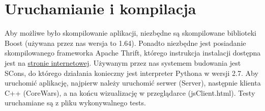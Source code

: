 \chapter{Uruchamianie i kompilacja}
Aby możliwe było skompilowanie aplikacji, niezbędne są skompilowane biblioteki Boost (używana przez nas wersja to 1.64). Ponadto niezbędne jest posiadanie skompilowanego frameworka Apache Thrift, którego instrukcja instalacji dostępna jest na \href{https://thrift.apache.org/}{stronie internetowej}. Używanym przez nas systemem budowania jest SCons, do którego działania konieczny jest interpreter Pythona w wersji 2.7.
Aby uruchomić aplikację, najpierw należy uruchomić serwer (Server), następnie klienta C++ (CoreWars), a na końcu wizualizację w przeglądarce (jsClient.html). Testy uruchamiane są z pliku wykonywalnego tests.